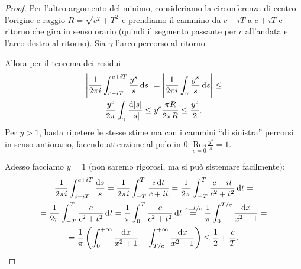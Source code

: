 \begin{proof}
  Per l'altro argomento del minimo, consideriamo la circonferenza di centro l'origine e raggio $R=\sqrt{c^2+T^2}$ e prendiamo il cammino da $c-iT$ a $c+iT$ e ritorno che gira in senso orario (quindi il segmento passante per $c$ all'andata e l'arco destro al ritorno). Sia $\gamma$ l'arco percorso al ritorno.
  \begin{center}
  \end{center}
  Allora per il teorema dei residui
  \begin{gather*}
    \left|\frac{1}{2\pi i}\int_{c-iT}^{c+iT} \frac{y^s}{s}\mathop{}\!\mathrm{d} s\right|=\left|\frac{1}{2\pi i}\int_\gamma \frac{y^s}{s}\mathop{}\!\mathrm{d} s \right| \le \\
    \frac{y^c}{2\pi} \int_{\gamma} \frac{\mathop{}\!\mathrm{d}|s|}{|s|} \le y^c\frac{\pi R}{2\pi R} \le \frac{y^c}{2}.
  \end{gather*}
  Per $y>1$, basta ripetere le stesse stime ma con i cammini ``di sinistra'' percorsi in senso antiorario, facendo attenzione al polo in $0$: $\displaystyle \underset{s=0}{\text{Res}}\,\frac{y^s}{s}=1$.

  Adesso facciamo $y=1$ (non saremo rigorosi, ma si può sistemare facilmente):
  \begin{gather*}
    \frac{1}{2\pi i}\int_{c-iT}^{c+iT}\frac{\diff s}{s}=\frac{1}{2\pi i}\int_{-T}^T \frac{i\diff t}{c+it}=\frac{1}{2\pi}\int_{-T}^T \frac{c-it}{c^2+t^2}\diff t=\\
    =\frac{1}{2\pi}\int_{-T}^T \frac{c}{c^2+t^2}\diff t=\frac{1}{\pi}\int_0^T \frac{c}{c^2+t^2}\diff t\overset{x=t/c}{=}\frac{1}{\pi}\int_0^{T/c} \frac{\diff x}{x^2+1}= \\
    =\frac{1}{\pi}\left(\int_0^{+\infty}\frac{\diff x}{x^2+1}-\int_{T/c}^{+\infty}\frac{\diff x}{x^2+1}\right) \le \frac{1}{2}+\frac{c}{T}.
  \end{gather*}
\end{proof}

